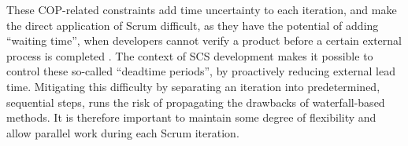 \documentclass[a4paper,nobib,justified,final]{tufte-book}
\begin{document}
These \ac{COP}-related constraints add time uncertainty to each iteration, and make the direct application of Scrum difficult, as they have the potential of adding ``waiting time'', when developers cannot verify a product before a certain external process is completed \cite{cooperAgileDevelopmentManufacturing2023}. The context of \acs{SCS} development makes it possible to control these so-called ``deadtime periods'', by proactively reducing external lead time.
Mitigating this difficulty by separating an iteration into predetermined, sequential steps, runs the risk of propagating the drawbacks of waterfall-based methods. It is therefore important to maintain some degree of flexibility and allow parallel work during each Scrum iteration.
\end{document}
